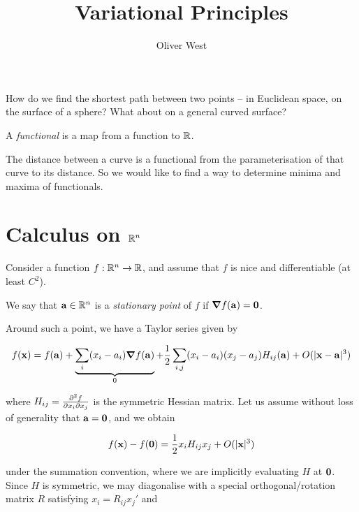 \documentclass{../template/note}
\author{Oliver West}
\title{Variational Principles}
\date{}
\begin{document}
    \maketitle

    \tableofcontents


    How do we find the shortest path between two points -- in Euclidean space, on the surface of a sphere? What about on a general curved surface?

    \begin{definition}[Functionals]
        A \emph{functional} is a map from a function to $\mathbb R$.
    \end{definition}
    
    The distance between a curve is a functional from the parameterisation of that curve to its distance. So we would like to find a way to determine minima and maxima of functionals.

    \section{Calculus on $\mathbb R^n$}

    Consider a function $f: \mathbb R^n \to \mathbb R$, and assume that $f$ is nice and differentiable (at least $C^2$).

    \begin{definition}
        We say that $\V a \in \RR^n$ is a \emph{stationary point} of $f$ if $\grad f(\V a) = \V 0$.
    \end{definition}
    
    Around such a point, we have a Taylor series given by

    \begin{align*}
        f(\V x) = f(\V a) + \underbrace{\sum_i (x_i-a_i) \grad f(\V a)}_{0} + \frac 1 2 \sum_{i, j} (x_i-a_i)(x_j-a_j) H_{ij}(\V a) + O(|\V x-\V a|^3)
    \end{align*}
    
    where $H_{ij} = \pd{^2f}{x_i \pr x_j}$ is the symmetric Hessian matrix. Let us assume without loss of generality that $\V a = \V 0$, and we obtain
    
    \begin{align*}
        f(\V x) - f(\V 0) = \frac 1 2 x_i H_{ij} x_j + O(|\V x|^3)
    \end{align*}
    
    under the summation convention, where we are implicitly evaluating $H$ at $\V 0$. Since $H$ is symmetric, we may diagonalise with a special orthogonal/rotation matrix $R$ satisfying $x_i = R_{ij} x_j'$ and
\end{document}
